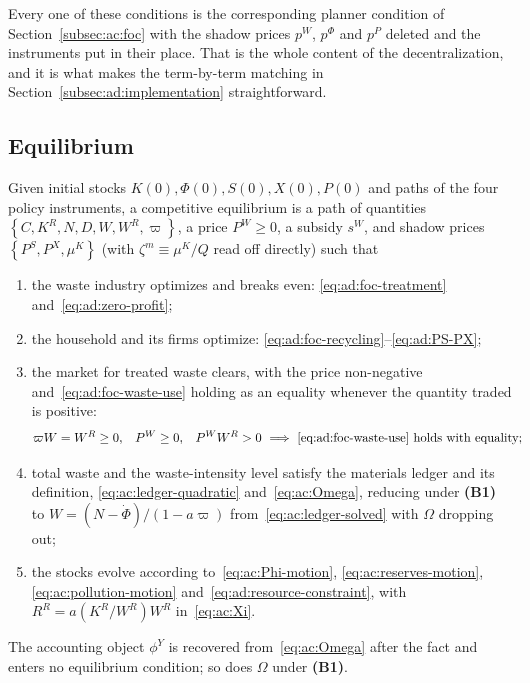 Every one of these conditions is the corresponding planner condition of Section~\ref{subsec:ac:foc} with the shadow prices $p^W$, $p^\Phi$ and $p^P$ deleted and the instruments put in their place. That is the whole content of the decentralization, and it is what makes the term-by-term matching in Section~\ref{subsec:ad:implementation} straightforward.

\subsection{Equilibrium}
\label{subsec:ad:equilibrium}

\begin{definition}\label{def:ad:equilibrium}
Given initial stocks $K(0),\Phi(0),S(0),X(0),P(0)$ and paths of the four policy instruments, a competitive equilibrium is a path of quantities $\left\{C,K^R,N,D,W,W^R,\varpi\right\}$, a price $P^W\ge 0$, a subsidy $s^W$, and shadow prices $\left\{P^S,P^X,\mu^K\right\}$ (with $\zeta^m\equiv\mu^K/Q$ read off directly) such that
\begin{enumerate}[label=(\roman*),leftmargin=2.4em]
\item the waste industry optimizes and breaks even: \eqref{eq:ad:foc-treatment} and~\eqref{eq:ad:zero-profit};
\item the household and its firms optimize: \eqref{eq:ad:foc-recycling}--\eqref{eq:ad:PS-PX};
\item the market for treated waste clears, with the price non-negative and~\eqref{eq:ad:foc-waste-use} holding as an equality whenever the quantity traded is positive:
\begin{align}
\varpi W &= W^R\ge 0,
&
P^W &\ge 0,
&
P^W W^R &> 0 \ \Longrightarrow\ \eqref{eq:ad:foc-waste-use}\ \text{holds with equality};
\label{eq:ad:clearing}
\end{align}
\item total waste and the waste-intensity level satisfy the materials ledger and its definition, \eqref{eq:ac:ledger-quadratic} and~\eqref{eq:ac:Omega}, reducing under \textbf{(B1)} to $W=\left(N-\dot\Phi\right)/\left(1-a\varpi\right)$ from~\eqref{eq:ac:ledger-solved} with $\Omega$ dropping out;
\item the stocks evolve according to~\eqref{eq:ac:Phi-motion}, \eqref{eq:ac:reserves-motion}, \eqref{eq:ac:pollution-motion} and~\eqref{eq:ad:resource-constraint}, with $R^R=a\!\left(K^R/W^R\right)W^R$ in~\eqref{eq:ac:Xi}.
\end{enumerate}
The accounting object $\phi^Y$ is recovered from~\eqref{eq:ac:Omega} after the fact and enters no equilibrium condition; so does $\Omega$ under \textbf{(B1)}.
\end{definition}

